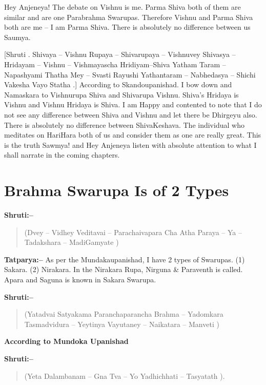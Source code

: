 Hey Anjeneya! The debate on Vishnu is me. Parma Shiva both of them are similar and are one Parabrahma Swarupas. Therefore Vishnu and Parma Shiva both are me – I am Parma Shiva. There is absolutely no difference between us Saumya. 

[Shruti . Shivaya – Vishnu Rupaya – Shivarupaya – Vishnuvey  Shivasya – Hridayam – Vishnu – Vishmayascha Hridiyam–Shiva  Yatham Taram – Napashyami Thatha Mey – Svasti Rayushi  Yathantaram – Nabhedasya – Shichi Vakesha Vayo Statha .] According to Skandoupanishad. I bow down and Namaskara to Vishnurupa Shiva and Shivarupa Vishnu. Shiva's Hridaya is Vishnu and Vishnu Hridaya is Shiva. I am Happy and contented to note that I do not see any difference between Shiva and Vishnu and let there be Dhirgeyu also. There is absolutely no difference between ShivaKeshava. The individual who meditates on HariHara both of us and consider them as one are really great. This is the truth Sawmya! and Hey Anjeneya listen with absolute attention to what I shall narrate in the coming chapters.

\chapter{Brahma Swarupa Is of 2 Types}

\textbf{Shruti:–}

\begin{verse}
(Dvey – Vidhey Veditavai – Parachaivapara Cha  Atha Paraya – Ya – Tadakshara – MadiGamyate )
\end{verse}

\textbf{Tatparya:–} As per the Mundakaupanishad, I have 2 types of Swarupas. (1) Sakara. (2) Nirakara. In the Nirakara Rupa, Nirguna \& Paraventh is called. Apara and Saguna is known in Sakara Swarupa.

\textbf{Shruti:–}

\begin{verse}
(Yatadvai Satyakama Paranchaparancha Brahma – Yadomkara  Tasmadvidura – Yeytinya Vayutaney – Naikatara – Manveti )
\end{verse}

\begin{flushright}
\textbf{According to Mundoka Upanishad}
\end{flushright}

\textbf{Shruti:–}

\begin{verse}
(Yeta Dalambanam – Gna Tva – Yo Yadhichhati – Tasyatath ).
\end{verse}

